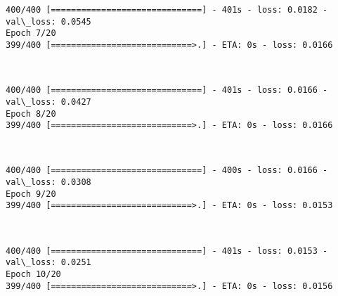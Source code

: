 \documentclass[11pt]{article}
\begin{document}
    \begin{Verbatim}[commandchars=\\\{\}]
400/400 [==============================] - 401s - loss: 0.0182 - val\_loss: 0.0545
Epoch 7/20
399/400 [============================>.] - ETA: 0s - loss: 0.0166
    \end{Verbatim}

    \begin{center}
    \end{center}
    { \hspace*{\fill} \\}
    
    \begin{Verbatim}[commandchars=\\\{\}]
400/400 [==============================] - 401s - loss: 0.0166 - val\_loss: 0.0427
Epoch 8/20
399/400 [============================>.] - ETA: 0s - loss: 0.0166
    \end{Verbatim}

    \begin{center}
    \end{center}
    { \hspace*{\fill} \\}
    
    \begin{Verbatim}[commandchars=\\\{\}]
400/400 [==============================] - 400s - loss: 0.0166 - val\_loss: 0.0308
Epoch 9/20
399/400 [============================>.] - ETA: 0s - loss: 0.0153
    \end{Verbatim}

    \begin{center}
    \end{center}
    { \hspace*{\fill} \\}
    
    \begin{Verbatim}[commandchars=\\\{\}]
400/400 [==============================] - 401s - loss: 0.0153 - val\_loss: 0.0251
Epoch 10/20
399/400 [============================>.] - ETA: 0s - loss: 0.0156
    \end{Verbatim}

    \begin{center}
    \end{center}
    { \hspace*{\fill} \\}
    
\end{document}
